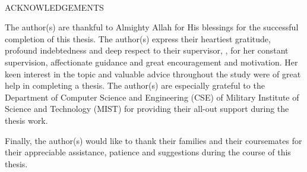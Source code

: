 \\
\begin{center}
  {{\Large ACKNOWLEDGEMENTS}}\\[60pt]
\end{center}

\justifying
The author(s) are thankful to Almighty Allah for His blessings for the successful
completion of this thesis. The author(s) express their heartiest gratitude, profound indebtedness and deep respect to their supervisor, {\def\supdel{, }\supervisor}, for her constant supervision, affectionate guidance and great encouragement and motivation. Her keen interest in the topic and valuable advice throughout the study were of great help in completing a thesis. The author(s) are especially grateful to the Department of Computer Science and
Engineering (CSE) of Military Institute of Science and Technology (MIST) for providing their all-out support during the thesis work.



Finally,  the author(s) would like to thank their families and their coursemates for
their appreciable assistance, patience and suggestions during the
course of this thesis.

\endinput
